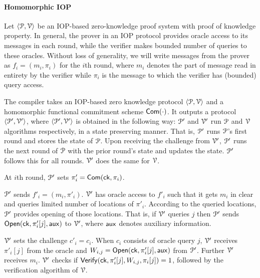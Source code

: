 \paragraph*{Homomorphic IOP} Let $\langle \mathcal{P},\mathcal{V}\rangle$ be an IOP-based zero-knowledge proof system with proof of knowledge property. In general, the prover in an IOP protocol provides oracle access to its messages in each round, while the verifier makes bounded number of queries to these oracles. Without loss of generality, we will write messages from the prover as $f_i = (m_i, \pi_i)$ for the $i$th round, where $m_i$ denotes the part of message read in entirety by the verifier while $\pi_i$ is the message to which the verifier has (bounded) query access.

The compiler takes an IOP-based zero knowledge protocol $\langle \mathcal{P},\mathcal{V}\rangle$ and a homomorphic functional commitment scheme $\mathsf{Com}(\cdot)$. It outputs a protocol $\langle \mathcal{P}',\mathcal{V}'\rangle$, where $\langle \mathcal{P}',\mathcal{V}'\rangle$ is obtained in the following way: $\mathcal{P}'$ and $\mathcal{V}'$ run $\mathcal{P}$ and $\mathcal{V}$ algorithms respectively, in a state preserving manner. That is, $\mathcal{P}'$ runs $\mathcal{P}$'s first round and stores the state of $\mathcal{P}$. Upon receiving the challenge from $\mathcal{V}'$, $\mathcal{P}'$ runs the next round of $\mathcal{P}$ with the prior round's state and updates the state. $\mathcal{P}'$ follows this for all rounds. $\mathcal{V}'$ does the same for $\mathcal{V}$. 
 
At $i$th round, $\mathcal{P}'$ sets $\pi'_i = \mathsf{Com}(\mathsf{ck},\pi_i)$.

$\mathcal{P}'$ sends $f'_i = (m_i, \pi'_i)$. $\mathcal{V}'$ has oracle access to $f'_i$ such that it gets $m_i$ in clear and queries limited number of locations of $\pi'_i$. According to the queried locations, $\mathcal{P}'$ provides opening of those locations. That is, if $\mathcal{V}'$ queries $j$ then $\mathcal{P}'$ sends $\mathsf{Open}(\mathsf{ck}, \pi'_i[j], \mathsf{aux})$ to $\mathcal{V}'$, where $\mathsf{aux}$ denotes auxiliary information.

$\mathcal{V}'$ sets the challenge $c'_i = c_i$. When $c_i$ consists of oracle query $j$, $\mathcal{V}'$ receives $\pi'_i[j]$ from the oracle and $W_{i,j} = \mathsf{Open}(\mathsf{ck}, \pi'_i[j], \mathsf{aux})$ from $\mathcal{P}'$. Further $\mathcal{V}'$ receives $m_i$. $\mathcal{V}'$ checks if $\mathsf{Verify}(\mathsf{ck}, \pi'_i[j], W_{i,j}, \pi_i[j]) = 1$, followed by the verification algorithm of $\mathcal{V}$.


